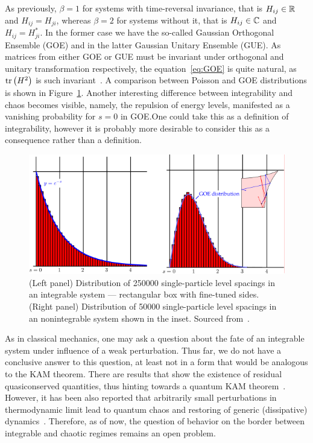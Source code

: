 As previously, \(\beta = 1\) for systems with time-reversal invariance, that is
\(H_{ij}\in \mathbb{R}{}\) and \(H_{ij} = H_{ji}\), whereas \(\beta = 2\) for systems without it,
that is \(H_{ij} \in \mathbb{C}{}\) and \(H_{ij} = H_{ji}^{\ast}\). In the former case we have
the so-called Gaussian Orthogonal Ensemble (GOE) and in the latter Gaussian Unitary Ensemble (GUE).
As matrices from either GOE or GUE must be invariant under orthogonal and unitary transformation
respectively, the equation~\eqref{eq:GOE} is quite natural, as \(\tr\left(H^2\right)\) is such
invariant~\autocite{DAlessio2016}. A comparison between Poisson and GOE distributions
is shown in Figure~\ref{fig:spacing}. Another interesting difference between integrability and
chaos becomes visible, namely, the repulsion of energy levels, manifested as a vanishing probability
for \(s=0\) in GOE.\@ One could take this as a definition of integrability, however it is probably
more desirable to consider this as a consequence rather than a definition.
\begin{figure}[htbp]
    \centering
    \includegraphics[width=1.0\textwidth,trim={0.03cm 0.03cm 0.03cm 0.03cm},clip]{Figures/spacing.pdf}
    \caption{(Left panel) Distribution of 250000 single-particle level spacings in an integrable system
    --- rectangular box with fine-tuned sides. (Right panel) Distribution of 50000 single-particle
    level spacings in an nonintegrable system shown in the inset. Sourced from~\autocite{DAlessio2016,Rudnick2008}.
     }\label{fig:spacing}
\end{figure}

As in classical mechanics, one may ask a question about the fate of an integrable system
under influence of a weak perturbation. Thus far, we do not have a conclusive answer to this
question, at least not in a form that would be analogous to the KAM theorem. There are results
that show the existence of residual quasiconserved quantities, thus hinting towards a
quantum KAM theorem~\autocite{Brandino2015}. However, it has been also reported that
arbitrarily small perturbations in thermodynamic limit lead to quantum chaos and restoring
of generic (dissipative) dynamics~\autocite{LeBlond2021}. Therefore, as of now, the question of behavior
on the border between integrable and chaotic regimes remains an open problem.